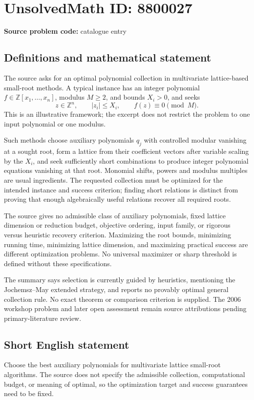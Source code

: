 \documentclass[11pt]{article}
\begin{document}
\section*{UnsolvedMath ID: 8800027}
\textbf{Source problem code:} catalogue entry
\subsection{Definitions and mathematical statement}
The source asks for an optimal polynomial collection in multivariate lattice-based small-root methods. A typical instance has an integer polynomial \(f\in\mathbb Z[x_1,\ldots,x_n]\), modulus \(M\ge2\), and bounds \(X_i>0\), and seeks
\[
 z\in\mathbb Z^n,\qquad |z_i|\le X_i,\qquad f(z)\equiv0\pmod M.
\]
This is an illustrative framework; the excerpt does not restrict the problem to one input polynomial or one modulus.

Such methods choose auxiliary polynomials \(q_j\) with controlled modular vanishing at a sought root, form a lattice from their coefficient vectors after variable scaling by the \(X_i\), and seek sufficiently short combinations to produce integer polynomial equations vanishing at that root. Monomial shifts, powers and modulus multiples are usual ingredients. The requested collection must be optimized for the intended instance and success criterion; finding short relations is distinct from proving that enough algebraically useful relations recover all required roots.

The source gives no admissible class of auxiliary polynomials, fixed lattice dimension or reduction budget, objective ordering, input family, or rigorous versus heuristic recovery criterion. Maximizing the root bounds, minimizing running time, minimizing lattice dimension, and maximizing practical success are different optimization problems. No universal maximizer or sharp threshold is defined without these specifications.

The summary says selection is currently guided by heuristics, mentioning the Jochemsz--May extended strategy, and reports no provably optimal general collection rule. No exact theorem or comparison criterion is supplied. The 2006 workshop problem and later open assessment remain source attributions pending primary-literature review.
\subsection{Short English statement}
Choose the best auxiliary polynomials for multivariate lattice small-root algorithms. The source does not specify the admissible collection, computational budget, or meaning of optimal, so the optimization target and success guarantees need to be fixed.
\end{document}
